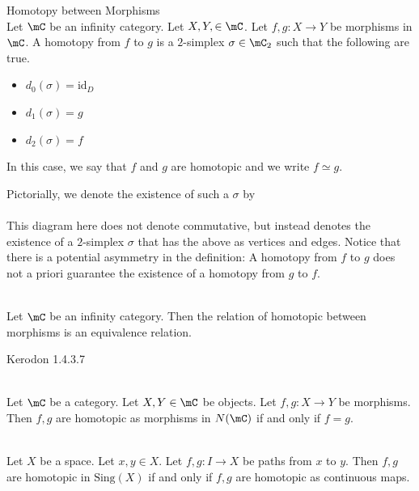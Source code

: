 \documentclass[a4paper]{article}
\begin{document}
\begin{defn}{Homotopy between Morphisms}{}\\
Let $\mC$ be an infinity category. Let $X,Y,\in\mC$. Let $f,g:X\to Y$ be morphisms in $\mC$. A homotopy from $f$ to $g$ is a $2$-simplex $\sigma\in\mC_2$ such that the following are true. 
\begin{itemize}
\item $d_0(\sigma)=\text{id}_D$
\item $d_1(\sigma)=g$
\item $d_2(\sigma)=f$
\end{itemize}
In this case, we say that $f$ and $g$ are homotopic and we write $f\simeq g$. 
\end{defn}

Pictorially, we denote the existence of such a $\sigma$ by \\
\\

This diagram here does not denote commutative, but instead denotes the existence of a $2$-simplex $\sigma$ that has the above as vertices and edges. Notice that there is a potential asymmetry in the definition: A homotopy from $f$ to $g$ does not a priori guarantee the existence of a homotopy from $g$ to $f$. 

\begin{lmm}{}{}\\ Let $\mC$ be an infinity category. Then the relation of homotopic between morphisms is an equivalence relation. 
\end{lmm}

Kerodon 1.4.3.7

\begin{eg}{}{}\\
Let $\mC$ be a category. Let $X,Y\in\mC$ be objects. Let $f,g:X\to Y$ be morphisms. Then $f,g$ are homotopic as morphisms in $N(\mC)$ if and only if $f=g$. 
\end{eg}

\begin{eg}{}{}\\
Let $X$ be a space. Let $x,y\in X$. Let $f,g:I\to X$ be paths from $x$ to $y$. Then $f,g$ are homotopic in $\text{Sing}(X)$ if and only if $f,g$ are homotopic as continuous maps. 
\end{eg}
\end{document}
